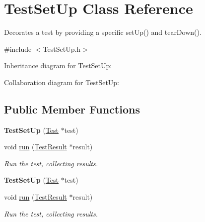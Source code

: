 \hypertarget{class_test_set_up}{\section{Test\+Set\+Up Class Reference}
\label{class_test_set_up}
}


Decorates a test by providing a specific set\+Up() and tear\+Down().  




{\ttfamily \#include $<$Test\+Set\+Up.\+h$>$}



Inheritance diagram for Test\+Set\+Up\+:


Collaboration diagram for Test\+Set\+Up\+:
\subsection*{Public Member Functions}
\begin{DoxyCompactItemize}
\item 
\hypertarget{class_test_set_up_a2410d275e9f9ab45c205feb1359cb231}{{\bfseries Test\+Set\+Up} (\hyperlink{class_test}{Test} $\ast$test)}\label{class_test_set_up_a2410d275e9f9ab45c205feb1359cb231}

\item 
\hypertarget{class_test_set_up_aa3f79125254c288d6effee6df8e7d5fb}{void \hyperlink{class_test_set_up_aa3f79125254c288d6effee6df8e7d5fb}{run} (\hyperlink{class_test_result}{Test\+Result} $\ast$result)}\label{class_test_set_up_aa3f79125254c288d6effee6df8e7d5fb}

\begin{DoxyCompactList}\small\item\em Run the test, collecting results. \end{DoxyCompactList}\item 
\hypertarget{class_test_set_up_af89f6399e1c84dd43ac43253a6550c44}{{\bfseries Test\+Set\+Up} (\hyperlink{class_test}{Test} $\ast$test)}\label{class_test_set_up_af89f6399e1c84dd43ac43253a6550c44}

\item 
\hypertarget{class_test_set_up_aa3f79125254c288d6effee6df8e7d5fb}{void \hyperlink{class_test_set_up_aa3f79125254c288d6effee6df8e7d5fb}{run} (\hyperlink{class_test_result}{Test\+Result} $\ast$result)}\label{class_test_set_up_aa3f79125254c288d6effee6df8e7d5fb}

\begin{DoxyCompactList}\small\item\em Run the test, collecting results. \end{DoxyCompactList}\end{DoxyCompactItemize}
